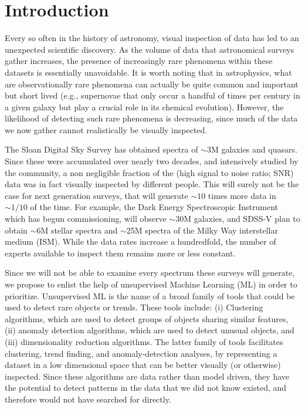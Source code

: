 \documentclass[fleqn,usenatbib]{mnras}
\begin{document}

\section{Introduction}

Every so often in the history of astronomy, visual inspection of data has led to an unexpected scientific discovery. As the volume of data that astronomical surveys gather increases, the presence of increasingly rare phenomena within these datasets is essentially unavoidable. It is worth noting that in astrophysics, what are observationally rare phenomena can actually be quite common and important but short lived (e.g., supernovae that only occur a handful of times per century in a given galaxy but play a crucial role in its chemical evolution). However, the likelihood  of detecting such rare phenomena is decreasing, since much of the data we now gather cannot realistically be visually inspected. 

The Sloan Digital Sky Survey \citep[SDSS; ][]{eisenstein11} has obtained spectra of $\sim 3$M galaxies and quasars. Since these were accumulated over nearly two decades, and intensively studied by the community, a non negligible fraction of the (high signal to noise ratio; SNR) data was in fact visually inspected by different people. This will surely not be the case for next generation surveys, that will generate $\sim10$ times more data in $\sim 1/10$ of the time. For example, the Dark Energy Spectroscopic Instrument \citep[DESI, ][]{levi13} which has begun commissioning, will observe $\sim 30$M galaxies, and SDSS-V \citep{kollmeier17} plan to obtain $\sim$6M stellar spectra and $\sim$25M spectra of the Milky Way interstellar medium (ISM). While the data rates increase a hundredfold, the number of experts available to inspect them remains more or less constant. 

Since we will not be able to examine every spectrum these surveys will generate,  we propose to enlist the help of unsupervised Machine Learning (ML) in order to prioritize. Unsupervised ML is the name of a broad family of tools that could be used to detect rare objects or trends. These tools include: (i) Clustering algorithms, which are used  to detect groups of objects sharing similar features, (ii) anomaly detection algorithms, which are used to detect unusual objects, and (iii) dimensionality reduction algorithms. The latter family of tools facilitates clustering, trend finding,  and anomaly-detection analyses, by representing a dataset in a low dimensional space that can be better visually (or otherwise) inspected. Since these algorithms are data rather than model driven, they have the potential to detect patterns  in the data that we did not know existed, and therefore would not have searched for directly.
\end{document}
